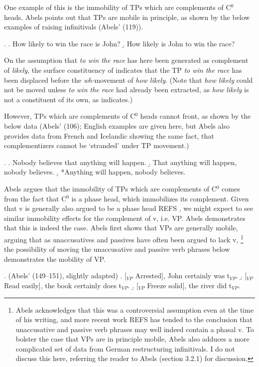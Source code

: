 \documentclass[11pt,letterpaper]{article}
\begin{document}
 One example of this is the immobility of TPs which are complements of C$^0$ heads.
 Abels points out that TPs are mobile in principle, as shown by the below examples of raising infinitivals (Abels' (119)).
 
 \ex. 	\a. How likely to win the race is John?
 	\b. How likely is John to win the race?
 	
 On the assumption that {\it to win the race} has here been generated as complement of {\it likely}, the surface constituency of \Last[b] indicates that the TP {\it to win the race} has been displaced before the {\it wh-}movement of {\it how likely}.
 (Note that {\it how likely} could not be moved unless {\it to win the race} had already been extracted, as {\it how likely} is not a constituent of its own, as \Last[a] indicates.)
 
 However, TPs which are complements of C$^0$ heads cannot front, as shown by the below data (Abels' (106); English examples are given here, but Abels also provides data from French and Icelandic showing the same fact, that complementizers cannot be `stranded' under TP movement.)
 
 \ex. 	\a. Nobody believes that anything will happen.
 	\b. That anything will happen, nobody believes.
 	\b. *Anything will happen, nobody believes.
 	
 Abels argues that the immobility of TPs which are complements of C$^0$ comes from the fact that C$^0$ is a phase head, which immobilizes its complement.
 Given that v is generally also argued to be a phase head REFS %
 , we might expect to see similar immobility effects for the complement of v, i.e. VP.
 Abels demonstrates that this is indeed the case.
 Abels first shows that VPs are generally mobile, arguing that as unaccusatives and passives have often been argued to lack v,
 \footnote{Abels acknowledges that this was a controversial assumption even at the time of his writing, and more recent work REFS %
 has tended to the conclusion that unaccusative and passive verb phrases may well indeed contain a phasal v.
 To bolster the case that VPs are in principle mobile, Abels also adduces a more complicated set of data from German restructuring infinitivals.
 I do not discuss this here, referring the reader to Abels (section 3.2.1) for discussion.}
 the possibility of moving the unaccusative and passive verb phrases below demonstrates the mobility of VP.
 
 \ex. 	(Abels' (149--151), slightly adapted)
 	\a. [$_{VP}$ Arrested], John certainly was t$_{VP}$.
 	\b. [$_{VP}$ Read easily], the book certainly does t$_{VP}$.
 	\b. [$_{VP}$ Freeze solid], the river did t$_{VP}$.
 	
\end{document}
